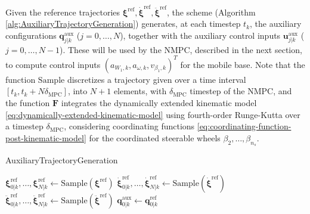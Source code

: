 Given the reference trajectories $\bm{\xi}^{\mathrm{ref}}, \dot{\bm{\xi}}^{\mathrm{ref}}, \ddot{\bm{\xi}}^{\mathrm{ref}}$, the scheme (Algorithm \ref{alg:AuxiliaryTrajectoryGeneration}) generates, at each timestep $t_k$, the auxiliary configurations $\bm{q}_{j|k}^{\mathrm{aux}}$ ($j = 0, \dots, N$), together with the auxiliary control inputs $\bm{u}_{j|k}^{\mathrm{aux}}$ ($j = 0, \dots, N-1$). These will be used by the NMPC, described in the next section, to compute control inputs $(a_{W_1, k}, a_{\omega, k}, v_{\beta_1, k})^T$ for the mobile base. Note that the function $\mathrm{Sample}$ discretizes a trajectory given over a time interval $[t_k, t_{k} + N \delta_{\mathrm{MPC}}]$, into $N + 1$ elements, with $\delta_{\mathrm{MPC}}$ timestep of the NMPC, and the function $\bm{F}$ integrates the dynamically extended kinematic model \eqref{eq:dynamically-extended-kinematic-model} using fourth-order Runge-Kutta over a timestep $\delta_{\mathrm{MPC}}$, considering coordinating functions \eqref{eq:coordinating-function-post-kinematic-model} for the coordinated steerable wheels $\beta_2, \dots, \beta_{n_s}$.

\begin{algorithm}
\small
\caption{AuxiliaryTrajectoryGeneration}
\label{alg:AuxiliaryTrajectoryGeneration}
\BlankLine
$\bm{\xi}_{0|k}^{\mathrm{ref}}, \dots, \bm{\xi}_{N|k}^{\mathrm{ref}} \gets \mathrm{Sample}(\bm{\xi}^{\mathrm{ref}})$\;
$\dot{\bm{\xi}}_{0|k}^{\mathrm{ref}}, \dots, \dot{\bm{\xi}}_{N|k}^{\mathrm{ref}} \gets \mathrm{Sample}(\dot{\bm{\xi}}^{\mathrm{ref}})$\;
$\ddot{\bm{\xi}}_{0|k}^{\mathrm{ref}}, \dots, \ddot{\bm{\xi}}_{N|k}^{\mathrm{ref}} \gets \mathrm{Sample}(\ddot{\bm{\xi}}^{\mathrm{ref}})$\;
$\bm{q}_{0|k}^{\mathrm{aux}} \gets \bm{q}_{0|k}^{\mathrm{ref}}$\;
\;
\end{algorithm}

